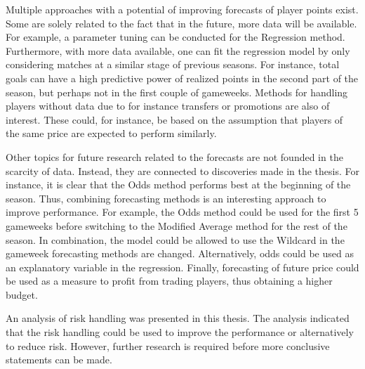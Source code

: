 \newpar

Multiple approaches with a potential of improving forecasts of player points exist. Some are solely related to the fact that in the future, more data will be available. For example, a parameter tuning can be conducted for the Regression method. Furthermore, with more data available, one can fit the regression model by only considering matches at a similar stage of previous seasons. For instance, total goals can have a high predictive power of realized points in the second part of the season, but perhaps not in the first couple of gameweeks. Methods for handling players without data due to for instance transfers or promotions are also of interest. These could, for instance, be based on the assumption that players of the same price are expected to perform similarly.

\newpar

Other topics for future research related to the forecasts are not founded in the scarcity of data. Instead, they are connected to discoveries made in the thesis. For instance, it is clear that the Odds method performs best at the beginning of the season. Thus, combining forecasting methods is an interesting approach to improve performance. For example, the Odds method could be used for the first 5 gameweeks before switching to the Modified Average method for the rest of the season. In combination, the model could be allowed to use the Wildcard in the gameweek forecasting methods are changed. Alternatively, odds could be used as an explanatory variable in the regression. Finally, forecasting of future price could be used as a measure to profit from trading players, thus obtaining a higher budget.

\newpar

An analysis of risk handling was presented in this thesis. The analysis indicated that the risk handling could be used to improve the performance or alternatively to reduce risk. However, further research is required before more conclusive statements can be made.